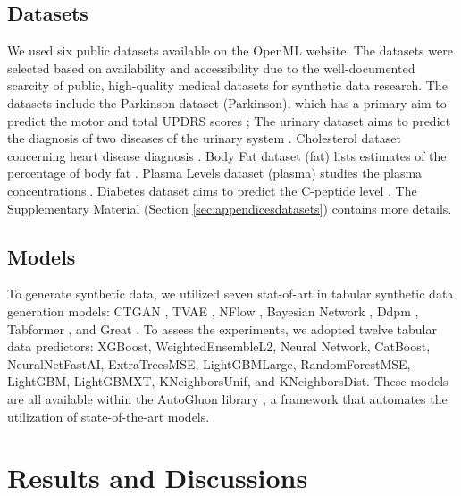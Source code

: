 \documentclass{article}
\theoremstyle{plain}
\theoremstyle{definition}
\theoremstyle{remark}
\begin{document}
\subsection{Datasets}
We used six public datasets available on the OpenML website. The datasets were selected based on availability and accessibility due to the well-documented scarcity of public, high-quality medical datasets for synthetic data research. The datasets include the Parkinson dataset \cite{tsanas2009accurate} (Parkinson), which has a primary aim to predict the motor and total UPDRS scores \cite{openml_4531}; The urinary dataset \cite{czerniak2003application} aims to predict the diagnosis of two diseases of the urinary system \cite{openml_1455}. Cholesterol dataset \cite{Detrano1989} concerning heart disease diagnosis \cite{OpenMLheart}. Body Fat dataset (fat)  lists estimates of the percentage of body fat \cite{OpenML560}.   Plasma Levels dataset (plasma) \cite{Nierenberg1989}  studies the plasma concentrations.\cite{OpenML511}. Diabetes dataset \cite{Torgo}  aims to predict the C-peptide level \cite{OpenML212}. The Supplementary Material (Section \ref{sec:appendicesdatasets}) contains more details.


  \subsection{Models}

To generate synthetic data, we utilized seven stat-of-art in tabular synthetic data generation models: CTGAN \cite{ctgan}, TVAE \cite{ctgan}, NFlow \cite{Kobyzev2021}, Bayesian  Network \cite{young2009using}, Ddpm \cite{ho2020denoisingdiffusionprobabilisticmodels}, Tabformer \cite{padhi2021tabulartransformersmodelingmultivariate}, and Great \cite{borisov2023languagemodelsrealistictabular}. To assess the experiments, we adopted twelve tabular data predictors: XGBoost, WeightedEnsembleL2, Neural Network, CatBoost, NeuralNetFastAI, ExtraTreesMSE, LightGBMLarge, RandomForestMSE, LightGBM, LightGBMXT, KNeighborsUnif, and KNeighborsDist. These models are all available within the AutoGluon library \cite{erickson2020autogluontabular}, a framework that automates the utilization of state-of-the-art models. 






\section{Results and Discussions}
\end{document}

